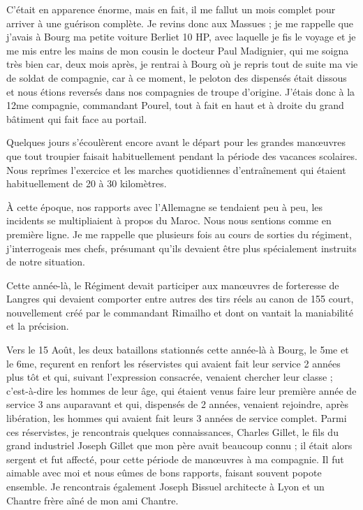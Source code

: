 \documentclass[11pt,a4paper]{report}
\begin{document}
C'était en apparence énorme, mais en fait, il me fallut un mois complet pour arriver à une guérison complète. Je revins donc aux Massues ; je me rappelle que j'avais à Bourg ma petite voiture Berliet 10 HP, avec laquelle je fis le voyage et je me mis entre les mains de mon cousin le docteur Paul Madignier, qui me soigna très bien car, deux mois après, je rentrai à Bourg où je repris tout de suite ma vie de soldat de compagnie, car à ce moment, le peloton des dispensés était dissous et nous étions reversés dans nos compagnies de troupe d'origine. J'étais donc à la 12me compagnie, commandant Pourel, tout à fait en haut et à droite du grand bâtiment qui fait face au portail.

Quelques jours s'écoulèrent encore avant le départ pour les grandes manœuvres que tout troupier faisait habituellement pendant la période des vacances scolaires. Nous reprîmes l'exercice et les marches quotidiennes d'entraînement qui étaient habituellement de 20 à 30 kilomètres.

À cette époque, nos rapports avec l'Allemagne se tendaient peu à peu, les incidents se multipliaient à propos du Maroc. Nous nous sentions comme en première ligne. Je me rappelle que plusieurs fois au cours de sorties du régiment, j'interrogeais mes chefs, présumant qu'ils devaient être plus spécialement instruits de notre situation.

Cette année-là, le Régiment devait participer aux manœuvres de forteresse de Langres qui devaient comporter entre autres des tirs réels au canon de 155 court, nouvellement créé par le commandant Rimailho et dont on vantait la maniabilité et la précision.

Vers le 15 Août, les deux bataillons stationnés cette année-là à Bourg, le 5me et le 6me, reçurent en renfort les réservistes qui avaient fait leur service 2 années plus tôt et qui, suivant l'expression consacrée, venaient chercher leur classe ; c'est-à-dire les hommes de leur âge, qui étaient venus faire leur première année de service 3 ans auparavant et qui, dispensés de 2 années, venaient rejoindre, après libération, les hommes qui avaient fait leurs 3 années de service complet. Parmi ces réservistes, je rencontrais quelques connaissances, Charles Gillet, le fils du grand industriel Joseph Gillet que mon père avait beaucoup connu ; il était alors sergent et fut affecté, pour cette période de manœuvres à ma compagnie. Il fut aimable avec moi et nous eûmes de bons rapports, faisant souvent popote ensemble. Je rencontrais également Joseph Bissuel architecte à Lyon et un Chantre frère aîné de mon ami Chantre.
\end{document}
